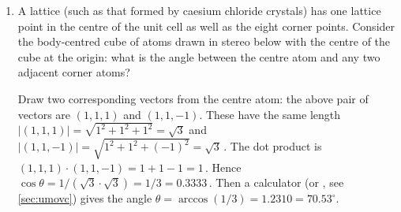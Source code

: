 \begin{example}
\begin{enumerate}
\item A  lattice (such as that formed by caesium chloride crystals) has one lattice point in the centre of the unit cell as well as the eight corner points.
Consider the body-centred cube of atoms drawn in stereo below with the centre of the cube at the origin: what is the angle between the centre atom and any two adjacent corner atoms?
\begin{center}
 {
}
\end{center}
\begin{solution} 
Draw two corresponding vectors from the centre atom: the above pair of vectors are \((1,1,1)\) and \((1,1,-1)\).
These have the same length \(|(1,1,1)|=\sqrt{1^2+1^2+1^2}=\sqrt3\) and \(|(1,1,-1)|=\sqrt{1^2+1^2+(-1)^2}=\sqrt3\)\,.
The dot product is \((1,1,1)\cdot(1,1,-1)=1+1-1=1\)\,.
Hence \(\cos\theta=1/(\sqrt3\cdot\sqrt3)=1/3=0.3333\)\,.
Then a calculator (or \script, see \cref{sec:umovc}) gives the angle \(\theta =\arccos(1/3) =1.2310 =70.53^\circ\).
\end{solution}
\end{enumerate}
\end{example}


 




